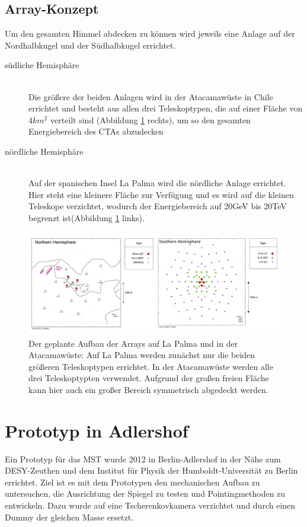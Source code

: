 \subsection{Array-Konzept}
Um den gesamten Himmel abdecken zu können wird jeweils eine Anlage auf der Nordhalbkugel und der Südhalbkugel errichtet.
\begin{description}
\item[südliche Hemisphäre]\hfill \\
Die größere der beiden Anlagen wird in der Atacamawüste in Chile errichtet und besteht aus allen drei Teleskoptypen, die auf einer Fläche von $4\unit{km^2}$ verteilt sind (Abbildung \ref{img:ArrayLayout} rechts), um so den gesamten Energiebereich des CTAs abzudecken
\item[nördliche Hemisphäre]\hfill \\ 
Auf der spanischen Insel La Palma wird die nördliche Anlage errichtet. Hier steht eine kleinere Fläche zur Verfügung und es wird auf die kleinen Teleskope verzichtet, wodurch der Energiebereich auf 20GeV bis 20TeV begrenzt  ist(Abbildung \ref{img:ArrayLayout} links).
\end{description}

\begin{figure}[htbp]
\centering
\includegraphics[width=\textwidth]{Images/ArrayLayout.png}
\caption{Der geplante Aufbau der Arrays auf La Palma und in der Atacamawüste: Auf La Palma werden zunächst nur die beiden größeren Teleskoptypen errichtet. In der Atacamawüste werden alle drei Teleskoptypten verwendet. Aufgrund der großen freien Fläche kann hier auch ein großer Bereich symmetrisch abgedeckt werden.}
\label{img:ArrayLayout}
\end{figure}

\section{Prototyp in Adlershof}
Ein Prototyp für das MST wurde 2012 in Berlin-Adlershof in der Nähe zum DESY-Zeuthen und dem Institut für Physik der Humboldt-Universität zu Berlin errichtet. Ziel ist es mit dem Prototypen den mechanischen Aufbau zu untersuchen, die Ausrichtung der Spiegel zu testen und Pointingmethoden zu entwickeln. Dazu wurde auf eine Tscherenkovkamera verzichtet und durch einen Dummy der gleichen Masse ersetzt.


